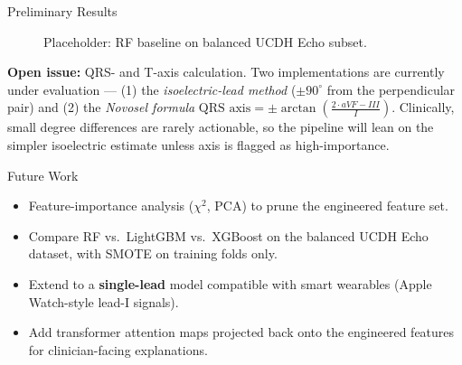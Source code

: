 \documentclass[final]{beamer}
\newlength{\colwidth}
\begin{document}
\begin{frame}[t]
\begin{columns}[t]
\begin{column}{\colwidth}
\begin{block}{Preliminary Results}
    \begin{figure}
      \centering
      \caption{Placeholder: RF baseline on balanced UCDH Echo subset.}
    \end{figure}

    \textbf{Open issue:} QRS- and T-axis calculation. Two implementations
    are currently under evaluation ---
    (1) the \emph{isoelectric-lead method} ($\pm 90^{\circ}$ from the
    perpendicular pair) and
    (2) the \emph{Novosel formula}
    $\text{QRS axis} = \pm \arctan\!\left(\tfrac{2 \cdot aVF - III}{I}\right)$.
    Clinically, small degree differences are rarely actionable, so the
    pipeline will lean on the simpler isoelectric estimate unless axis is
    flagged as high-importance.

  \end{block}

  \begin{block}{Future Work}

    \begin{itemize}
      \item Feature-importance analysis ($\chi^2$, PCA) to prune the
        engineered feature set.
      \item Compare RF vs.\ LightGBM vs.\ XGBoost on the balanced UCDH
        Echo dataset, with SMOTE on training folds only.
      \item Extend to a \textbf{single-lead} model compatible with smart
        wearables (Apple Watch-style lead-I signals).
      \item Add transformer attention maps projected back onto the
        engineered features for clinician-facing explanations.
    \end{itemize}


\end{block}
\end{column}
\end{columns}
\end{frame}
\end{document}
